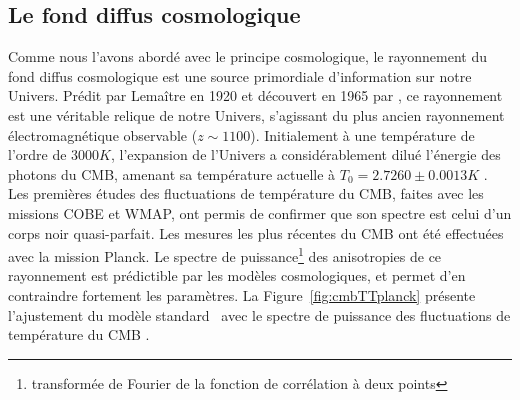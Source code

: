 \documentclass[../main/main.tex]{subfiles}
\begin{document}
\subsection{Le fond diffus cosmologique}

Comme nous l'avons abordé avec le principe cosmologique, le rayonnement
du fond diffus cosmologique est une source primordiale d'information sur
notre Univers. Prédit par Lemaître en 1920 et découvert en 1965 par
\citet{Penzias1965}, ce rayonnement est une véritable relique de notre
Univers, s'agissant du plus ancien rayonnement électromagnétique
observable ($z\sim 1100$). Initialement à une température de l'ordre de
$3000K$, l'expansion de l'Univers a considérablement dilué l'énergie des
photons du CMB, amenant sa température actuelle à
$T_{0}=2.7260\pm0.0013K$ \citep{Fixsen2009}. Les
premières études des fluctuations de température du CMB, faites avec les missions COBE et WMAP, ont
permis de confirmer que son spectre est celui d'un corps noir
quasi-parfait. Les mesures les plus récentes du CMB ont été effectuées avec la mission
Planck.
Le spectre de puissance\footnote{transformée
de Fourier de la fonction de corrélation à deux points} des anisotropies
de ce rayonnement est prédictible par les modèles cosmologiques, et
permet d'en contraindre fortement les paramètres. La
Figure~\ref{fig:cmbTTplanck} présente l'ajustement du modèle standard
\lcdm\ avec le spectre de puissance des fluctuations de température du
CMB \citep{Planckparams2018}.
\end{document}
